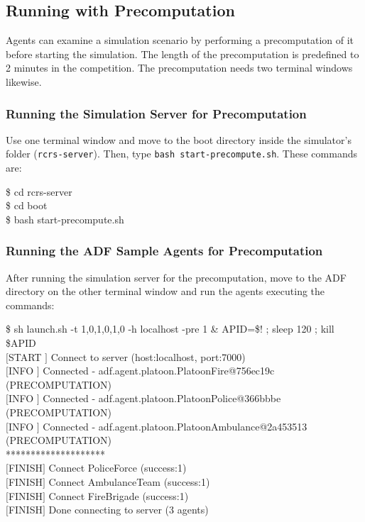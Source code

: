 \documentclass{article}
\begin{document}
\subsection{Running with Precomputation}
Agents can examine a simulation scenario by performing a precomputation of it before starting the simulation. The length of the precomputation is predefined to 2 minutes in the competition. The precomputation needs two terminal windows likewise.
\subsubsection{Running the Simulation Server for Precomputation}
Use one terminal window and move to the boot directory inside the simulator's folder (\texttt{rcrs-server}). Then, type \texttt{bash start-precompute.sh}. These commands are:

\begin{center}
   \begin{tcolorbox}[title=Running Simulation Server, width=.98\linewidth]
    {\ttfamily
    \$ cd rcrs-server\\
    \$ cd boot\\
    \$ bash start-precompute.sh
    }
  \end{tcolorbox}
\end{center}
\subsubsection{Running the ADF Sample Agents for Precomputation}
After running the simulation server for the precomputation, move to the ADF directory on the other terminal window and run the agents executing the commands:

\begin{center}
   \begin{tcolorbox}[title=Running Sample Agents, width=.98\linewidth]
    {\ttfamily
    \$ sh launch.sh -t 1,0,1,0,1,0 -h localhost -pre 1 \& APID=\$! ; sleep 120 ;
    kill \$APID\\
    $[$START $]$ Connect to server (host:localhost, port:7000)\\
    $[$INFO  $]$ Connected - adf.agent.platoon.PlatoonFire@756ec19c (PRECOMPUTATION)\\
    $[$INFO  $]$ Connected - adf.agent.platoon.PlatoonPolice@366bbbe (PRECOMPUTATION)\\
    $[$INFO  $]$ Connected - adf.agent.platoon.PlatoonAmbulance@2a453513 (PRECOMPUTATION)\\
    ********************\\
    $[$FINISH$]$ Connect PoliceForce (success:1)\\
    $[$FINISH$]$ Connect AmbulanceTeam (success:1)\\
    $[$FINISH$]$ Connect FireBrigade (success:1)\\
    $[$FINISH$]$ Done connecting to server (3 agents)
    }
  \end{tcolorbox}
\end{center}
\end{document}
